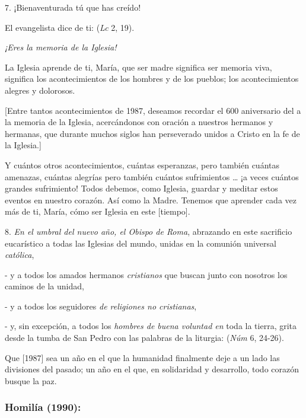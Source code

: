 \begin{body}
	7. ¡Bienaventurada tú que has creído!
	
	El evangelista dice de ti:  (\emph{Lc} 2, 19).
	
	\emph{¡Eres la memoria de la Iglesia!}
	
	La Iglesia aprende de ti, María, que ser madre significa ser memoria viva, significa  los acontecimientos de los hombres y de los pueblos; los acontecimientos alegres y dolorosos.
	
	{[}Entre tantos acontecimientos de 1987, deseamos recordar el 600 aniversario del  a la memoria de la Iglesia, acercándonos con oración a nuestros hermanos y hermanas, que durante muchos siglos han perseverado unidos a Cristo en la fe de la Iglesia.{]}
	
	Y cuántos otros acontecimientos, cuántas esperanzas, pero también cuántas amenazas, cuántas alegrías pero también cuántos sufrimientos \ldots{} ¡a veces cuántos grandes sufrimiento! Todos debemos, como Iglesia, guardar y meditar estos eventos en nuestro corazón. Así como la Madre. Tenemos que aprender cada vez más de ti, María, cómo ser Iglesia en este {[}tiempo{]}.
	
	8. \emph{En el umbral del nuevo año, el Obispo de Roma}, abrazando en este sacrificio eucarístico a todas las Iglesias del mundo, unidas en la comunión universal \emph{católica},
	
	- y a todos los amados hermanos \emph{cristianos} que buscan junto con nosotros los caminos de la unidad,
	
	- y a todos los seguidores \emph{de religiones no cristianas},
	
	- y, sin excepción, a todos los \emph{hombres de buena voluntad en} toda la tierra, grita desde la tumba de San Pedro con las palabras de la liturgia:  (\emph{Núm} 6, 24-26).
	
	Que {[}1987{]} sea un año en el que la humanidad finalmente deje a un lado las divisiones del pasado; un año en el que, en solidaridad y desarrollo, todo corazón busque la paz.
\end{body}

\subsubsection{Homilía (1990):}

